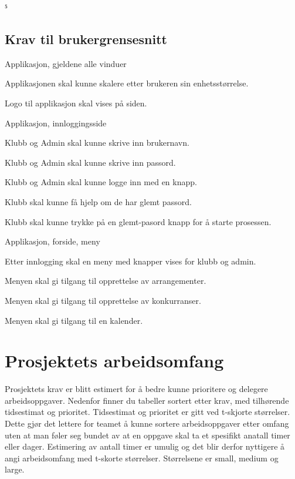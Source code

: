 ⁵\documentclass[norsk]{article}
\begin{document}
\begin{legal}
\subsection{Krav til brukergrensesnitt}
    \item Applikasjon, gjeldene alle vinduer 
    \begin{legal}
        \item Applikasjonen skal kunne skalere etter brukeren sin enhetsstørrelse.
        \item Logo til applikasjon skal vises på siden.
    \end{legal}
    \item Applikasjon, innloggingsside
    \begin{legal}
        \item Klubb og Admin skal kunne skrive inn brukernavn.
        \item Klubb og Admin skal kunne skrive inn passord.
        \item Klubb og Admin skal kunne logge inn med en knapp.
        \item Klubb skal kunne få hjelp om de har glemt passord.
        \item Klubb skal kunne trykke på en glemt-pasord knapp for å starte prosessen.
    \end{legal}
    \item Applikasjon, forside, meny
    \begin{legal}
        \item Etter innlogging skal en meny med knapper vises for klubb og admin.
        \item Menyen skal gi tilgang til opprettelse av arrangementer.
        \item Menyen skal gi tilgang til opprettelse av konkurranser.
        \item Menyen skal gi tilgang til en kalender.
    \end{legal}
\end{legal}

\section{Prosjektets arbeidsomfang}
Prosjektets krav er blitt estimert for å bedre kunne prioritere og delegere arbeidsoppgaver. Nedenfor finner du tabeller sortert etter krav, med tilhørende tidsestimat og prioritet.\newline
Tidsestimat og prioritet er gitt ved t-skjorte størrelser. Dette gjør det lettere for teamet å kunne sortere arbeidsoppgaver etter omfang uten at man føler seg bundet av at en oppgave skal ta et spesifikt anatall timer eller dager. Estimering av antall timer er umulig og det blir derfor nyttigere å angi arbeidsomfang med t-skorte størrelser. Størrelsene er small, medium og large.
\end{document}
